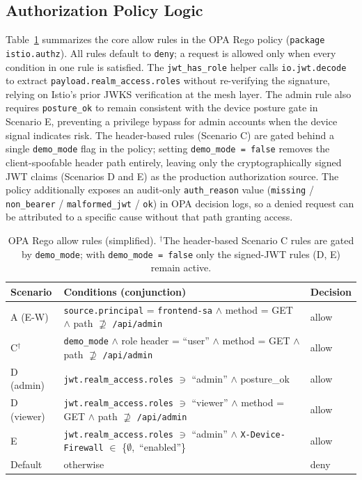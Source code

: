 \documentclass[conference]{IEEEtran}
\begin{document}
\subsection{Authorization Policy Logic}
\begin{sloppypar}
Table~\ref{tab:rego} summarizes the core allow rules in the OPA Rego policy
(\texttt{package istio.authz}). All rules default to \texttt{deny}; a request
is allowed only when every condition in one rule is satisfied. The
\texttt{jwt\_has\_role} helper calls \texttt{io.jwt.decode} to extract
\texttt{payload.realm\_access.roles} without re-verifying the signature,
relying on Istio's prior JWKS verification at the mesh layer. The admin rule
also requires \texttt{posture\_ok} to remain consistent with the device posture
gate in Scenario E, preventing a privilege bypass for admin accounts when the
device signal indicates risk. The header-based rules (Scenario C) are gated behind
a single \texttt{demo\_mode} flag in the policy; setting \texttt{demo\_mode = false}
removes the client-spoofable header path entirely, leaving only the cryptographically
signed JWT claims (Scenarios D and E) as the production authorization source. The
policy additionally exposes an audit-only \texttt{auth\_reason} value
(\texttt{missing} / \texttt{non\_bearer} / \texttt{malformed\_jwt} / \texttt{ok})
in OPA decision logs, so a denied request can be attributed to a specific cause
without that path granting access.
\end{sloppypar}

\begin{table}[!t]
\caption{OPA Rego allow rules (simplified). $^{\dagger}$The header-based Scenario C
rules are gated by \texttt{demo\_mode}; with \texttt{demo\_mode = false} only the
signed-JWT rules (D, E) remain active.}
\label{tab:rego}
\centering
\scriptsize
\begin{tabularx}{\columnwidth}{l >{\raggedright\arraybackslash}X l}
\toprule
Scenario & Conditions (conjunction) & Decision \\
\midrule
A (E-W) & \texttt{source.principal} = \texttt{frontend-sa} $\wedge$ method = GET $\wedge$ path $\not\supseteq$ \texttt{/api/admin} & allow \\
C$^{\dagger}$ & \texttt{demo\_mode} $\wedge$ role header = ``user'' $\wedge$ method = GET $\wedge$ path $\not\supseteq$ \texttt{/api/admin} & allow \\
D (admin) & \texttt{jwt.realm\_access.roles} $\ni$ ``admin'' $\wedge$ posture\_ok & allow \\
D (viewer) & \texttt{jwt.realm\_access.roles} $\ni$ ``viewer'' $\wedge$ method = GET $\wedge$ path $\not\supseteq$ \texttt{/api/admin} & allow \\
E & \texttt{jwt.realm\_access.roles} $\ni$ ``admin'' $\wedge$ \texttt{X-Device-Firewall} $\in$ \{$\emptyset$,\ ``enabled''\} & allow \\
Default & otherwise & deny \\
\bottomrule
\end{tabularx}
\end{table}
\end{document}

